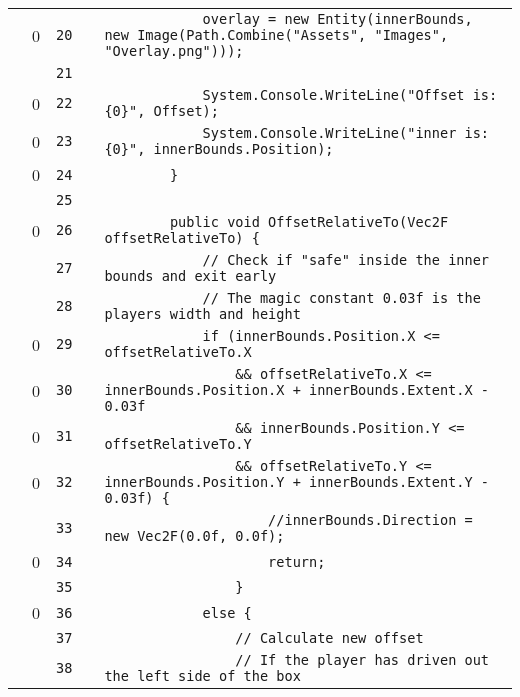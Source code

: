 \documentclass[a4paper,landscape,10pt]{article}
\begin{document}
\begin{longtable}[l]{lrrll}
\cellcolor{red} & 0 & \verb~20~ & & \verb~            overlay = new Entity(innerBounds, new Image(Path.Combine("Assets", "Images", "Overlay.png")));~\\
\cellcolor{gray} &  & \verb~21~ & & \verb~~\\
\cellcolor{red} & 0 & \verb~22~ & & \verb~            System.Console.WriteLine("Offset is: {0}", Offset);~\\
\cellcolor{red} & 0 & \verb~23~ & & \verb~            System.Console.WriteLine("inner is: {0}", innerBounds.Position);~\\
\cellcolor{red} & 0 & \verb~24~ & & \verb~        }~\\
\cellcolor{gray} &  & \verb~25~ & & \verb~~\\
\cellcolor{red} & 0 & \verb~26~ & & \verb~        public void OffsetRelativeTo(Vec2F offsetRelativeTo) {~\\
\cellcolor{gray} &  & \verb~27~ & & \verb~            // Check if "safe" inside the inner bounds and exit early~\\
\cellcolor{gray} &  & \verb~28~ & & \verb~            // The magic constant 0.03f is the players width and height~\\
\cellcolor{red} & 0 & \verb~29~ & & \verb~            if (innerBounds.Position.X <= offsetRelativeTo.X~\\
\cellcolor{red} & 0 & \verb~30~ & & \verb~                && offsetRelativeTo.X <= innerBounds.Position.X + innerBounds.Extent.X - 0.03f~\\
\cellcolor{red} & 0 & \verb~31~ & & \verb~                && innerBounds.Position.Y <= offsetRelativeTo.Y~\\
\cellcolor{red} & 0 & \verb~32~ & & \verb~                && offsetRelativeTo.Y <= innerBounds.Position.Y + innerBounds.Extent.Y - 0.03f) {~\\
\cellcolor{gray} &  & \verb~33~ & & \verb~                    //innerBounds.Direction = new Vec2F(0.0f, 0.0f);~\\
\cellcolor{red} & 0 & \verb~34~ & & \verb~                    return;~\\
\cellcolor{gray} &  & \verb~35~ & & \verb~                }~\\
\cellcolor{red} & 0 & \verb~36~ & & \verb~            else {~\\
\cellcolor{gray} &  & \verb~37~ & & \verb~                // Calculate new offset~\\
\cellcolor{gray} &  & \verb~38~ & & \verb~                // If the player has driven out the left side of the box~\\

\end{longtable}
\end{document}
